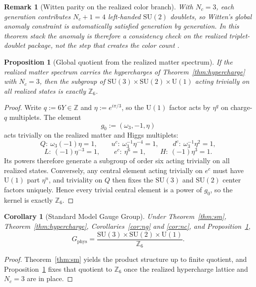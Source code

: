 \documentclass[11pt]{article}
\newtheorem{corollary}[theorem]{Corollary}
\newtheorem{proposition}[theorem]{Proposition}
\newtheorem{remark}[theorem]{Remark}
\newcommand{\SU}{\mathrm{SU}}
\newcommand{\U}{\mathrm{U}}
\begin{document}
\begin{remark}[Witten parity on the realized color branch]\label{rem:witten-parity}
With \(N_c=3\), each generation contributes \(N_c+1=4\) left-handed \(\SU(2)\) doublets, so Witten's global anomaly constraint is automatically satisfied generation by generation. In this theorem stack the anomaly is therefore a consistency check on the realized triplet-doublet package, not the step that creates the color count \cite{witten82}.
\end{remark}

\begin{proposition}[Global quotient from the realized matter spectrum]\label{prop:z6}
If the realized matter spectrum carries the hypercharges of Theorem~\ref{thm:hypercharge} with $N_c=3$, then the subgroup of $\SU(3)\times\SU(2)\times\U(1)$ acting trivially on all realized states is exactly $\mathbb Z_6$.
\end{proposition}

\begin{proof}
Write $q:=6Y\in\mathbb Z$ and $\eta:=e^{i\pi/3}$, so the $\U(1)$ factor acts by $\eta^q$ on charge-$q$ multiplets. The element
\[
g_0:=(\omega_3,-1,\eta)
\]
acts trivially on the realized matter and Higgs multiplets:
\[
Q:\ \omega_3(-1)\eta=1,\qquad
u^c:\ \omega_3^{-1}\eta^{-4}=1,\qquad
d^c:\ \omega_3^{-1}\eta^2=1,
\]
\[
L:\ (-1)\eta^{-3}=1,\qquad
e^c:\ \eta^6=1,\qquad
H:\ (-1)\eta^3=1.
\]
Its powers therefore generate a subgroup of order six acting trivially on all realized states. Conversely, any central element acting trivially on $e^c$ must have $\U(1)$ part $\eta^n$, and triviality on $Q$ then fixes the $\SU(3)$ and $\SU(2)$ center factors uniquely. Hence every trivial central element is a power of $g_0$, so the kernel is exactly $\mathbb Z_6$.
\end{proof}

\begin{corollary}[Standard Model Gauge Group]
Under Theorem~\ref{thm:sm}, Theorem~\ref{thm:hypercharge}, Corollaries~\ref{cor:ng} and \ref{cor:nc}, and Proposition~\ref{prop:z6},
\[
G_{\mathrm{phys}}=
\frac{\SU(3)\times\SU(2)\times\U(1)}{\mathbb Z_6}.
\]
\end{corollary}

\begin{proof}
Theorem~\ref{thm:sm} yields the product structure up to finite quotient, and Proposition~\ref{prop:z6} fixes that quotient to $\mathbb Z_6$ once the realized hypercharge lattice and $N_c=3$ are in place.
\end{proof}
\end{document}
